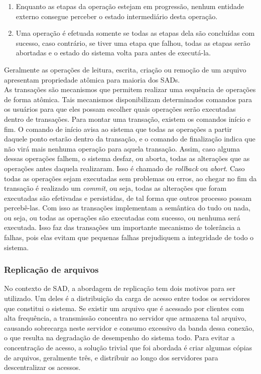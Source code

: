 	\begin{enumerate}
	\item Enquanto as etapas da operação estejam em progressão, nenhum entidade externo consegue perceber o estado intermediário desta operação.
	\item Uma operação é efetuada somente se todas as etapas dela são concluídas com sucesso, caso contrário, se tiver uma etapa que falhou, todas as etapas serão abortadas e o estado do sistema volta para antes de executá-la.
	\end{enumerate}
	
	Geralmente as operações de leitura, escrita, criação ou remoção de um arquivo apresentam propriedade atômica para maioria dos SADs.\\
	
	As transações são mecanismos que permitem realizar uma sequência de operações de forma atômica. Tais mecanismos disponibilizam determinados comandos para os usuários para que eles possam escolher quais operações serão executadas dentro de transações. Para montar uma transação, existem os comandos início e fim. O comando de início avisa ao sistema que todas as operações a partir daquele ponto estarão dentro da transação, e o comando de finalização indica que não virá mais nenhuma operação para aquela transação.
	Assim, caso alguma dessas operações falhem, o sistema desfaz, ou aborta, todas as alterações que as operações antes daquela realizaram. Isso é chamado de \textit{rollback} ou \textit{abort}. Caso todas as operações sejam executadas sem problemas ou erros, ao chegar no fim da transação é realizado um \textit{commit}, ou seja, todas as alterações que foram executadas são efetivadas e persistidas, de tal forma que outros processo possam percebê-las. Com isso as transações implementam a semântica do tudo ou nada, ou seja, ou todas as operações são executadas com sucesso, ou nenhuma será executada. Isso faz das transações um importante mecanismo de tolerância a falhas, pois elas evitam que pequenas falhas prejudiquem a integridade de todo o sistema.
	
	\subsubsection{Replicação de arquivos}
	No contexto de SAD, a abordagem de replicação tem dois motivos para ser utilizado. 
	Um deles é a distribuição da carga de acesso entre todos os servidores que constitui o sistema. 
	Se existir um arquivo que é acessado por clientes com alta frequência, a transmissão concentra no servidor que armazena tal arquivo, causando sobrecarga neste servidor e consumo excessivo da banda dessa conexão, o que resulta na degradação de desempenho do sistema todo. 
	Para evitar a concentração de acesso, a solução trivial que foi abordada é criar algumas cópias de arquivos, geralmente três, e distribuir ao longo dos servidores para descentralizar os acessos. \\
	
